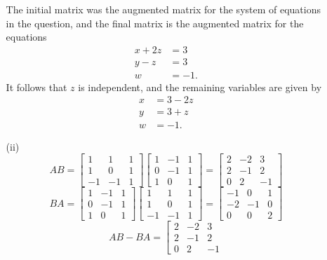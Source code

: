 \documentclass{amsart}
\renewcommand{\:}       {\colon}
\begin{document}
\begin{itemize}
\begin{itemize}
    The initial matrix was the augmented matrix for the system of
    equations in the question, and the final matrix is the augmented
    matrix for the equations
    \begin{align*}
     x + 2 z &= 3 \\
     y - z   &= 3 \\
     w       &= -1.
    \end{align*}
    It follows that $z$ is independent, and the remaining variables
    are given by 
    \begin{align*}
     x &= 3 - 2z \\
     y &= 3 + z \\
     w &= -1.
    \end{align*}
   \item[(ii)]
    {\tiny \[
     AB = 
      \left[\begin{array}{ccc}
       1 & 1 & 1 \\ 1 & 0 & 1 \\ -1 & -1 & 1
      \end{array}\right]
      \left[\begin{array}{ccc}
       1 & -1 & 1 \\ 0 & -1 & 1 \\ 1 & 0 & 1
      \end{array}\right] =
      \left[\begin{array}{ccc}
       2 & -2 & 3 \\ 2 & -1 & 2 \\ 0 & 2 & -1
      \end{array}\right]
    \] }
    {\tiny \[
     BA = 
      \left[\begin{array}{ccc}
       1 & -1 & 1 \\ 0 & -1 & 1 \\ 1 & 0 & 1
      \end{array}\right] 
      \left[\begin{array}{ccc}
       1 & 1 & 1 \\ 1 & 0 & 1 \\ -1 & -1 & 1
      \end{array}\right]=
      \left[\begin{array}{ccc}
       -1 & 0 & 1 \\ -2 & -1 & 0 \\ 0 & 0 & 2
      \end{array}\right]
    \] }
    {\tiny \[
     AB - BA = 
      \left[\begin{array}{ccc}
       2 & -2 & 3 \\ 2 & -1 & 2 \\ 0 & 2 & -1

\end{array}\]}
\end{itemize}
\end{itemize}
\end{document}
